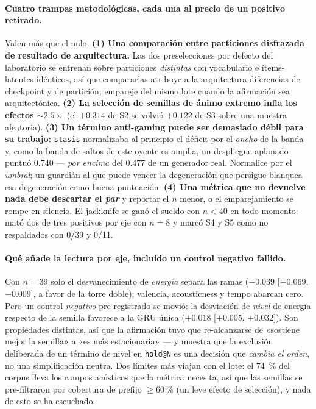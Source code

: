 \documentclass[11pt]{article}
\begin{document}
\paragraph{Cuatro trampas metodológicas, cada una al precio de un positivo
retirado.} Valen más que el nulo. \textbf{(1) Una comparación entre particiones
disfrazada de resultado de arquitectura.} Las dos preselecciones por defecto del
laboratorio se entrenan sobre particiones \emph{distintas} con vocabulario e
ítems-latentes idénticos, así que compararlas atribuye a la arquitectura
diferencias de checkpoint y de partición; empareje del mismo lote cuando la
afirmación sea arquitectónica. \textbf{(2) La selección de semillas de ánimo
extremo infla los efectos ${\sim}\num{2.5}\times$} (el $+\num{0.314}$ de S2 se
volvió $+\num{0.122}$ de S3 sobre una muestra aleatoria). \textbf{(3) Un término
anti-gaming puede ser demasiado débil para su trabajo:} \texttt{stasis} normalizaba
al principio el déficit por el \emph{ancho} de la banda y, como la banda de saltos
de este oyente es amplia, un despliegue aplanado puntuó \num{0.740} ---
\emph{por encima} del \num{0.477} de un generador real. Normalice por el
\emph{umbral}; un guardián al que puede vencer la degeneración que persigue blanquea
esa degeneración como buena puntuación. \textbf{(4) Una métrica que no devuelve
nada debe descartar el \emph{par}} y reportar el $n$ menor, o el emparejamiento se
rompe en silencio. El jackknife se ganó el sueldo con $n<40$ en todo momento: mató
dos de tres positivos por eje con $n=8$ y marcó S4 y S5 como no respaldados con
0/39 y 0/11.

\paragraph{Qué añade la lectura por eje, incluido un control negativo fallido.} Con
$n=\num{39}$ solo el desvanecimiento de \emph{energía} separa las ramas
($-\num{0.039}$ [$-\num{0.069}$, $-\num{0.009}$], a favor de la torre doble);
valencia, acousticness y tempo abarcan cero. Pero un control \emph{negativo}
pre-registrado se movió: la desviación de \emph{nivel} de energía respecto de la
semilla favorece a la GRU única ($+\num{0.018}$ [$+\num{0.005}$,
$+\num{0.032}$]). Son propiedades distintas, así que la afirmación tuvo que
re-alcanzarse de «sostiene mejor la semilla» a «es más estacionaria» --- y muestra
que la exclusión deliberada de un término de nivel en \texttt{hold@N} es una
decisión que \emph{cambia el orden}, no una simplificación neutra. Dos límites más
viajan con el lote: el \SI{74}{\percent} del corpus lleva los campos acústicos que
la métrica necesita, así que las semillas se pre-filtraron por cobertura de prefijo
$\ge\SI{60}{\percent}$ (un leve efecto de selección), y nada de esto se ha
escuchado.
\end{document}
